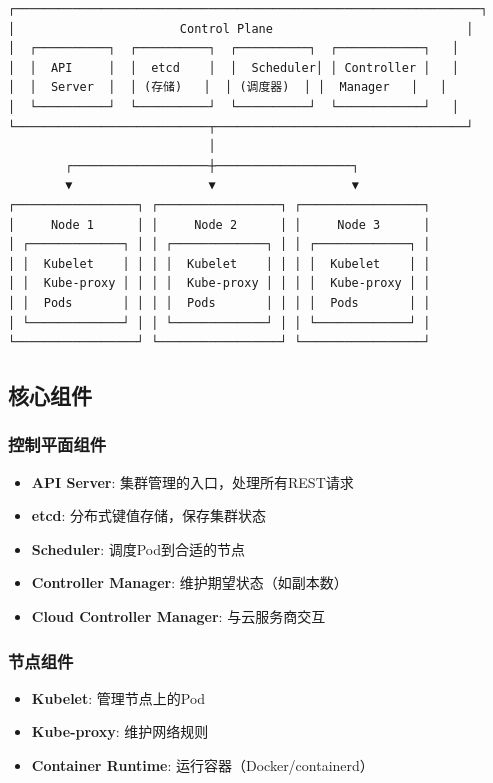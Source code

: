\documentclass[12pt,UTF8]{ctexbook}
\begin{document}
\begin{lstlisting}
┌─────────────────────────────────────────────────────────────────┐
│                       Control Plane                           │
│  ┌──────────┐  ┌──────────┐  ┌──────────┐  ┌────────────┐   │
│  │  API     │  │  etcd    │  │  Scheduler│ │ Controller │   │
│  │  Server  │  │ (存储)   │  │ (调度器)  │ │  Manager   │   │
│  └──────────┘  └──────────┘  └──────────┘  └────────────┘   │
└───────────────────────────┬───────────────────────────────────┘
                            │
        ┌───────────────────┼───────────────────┐
        ▼                   ▼                   ▼
┌─────────────────┐ ┌─────────────────┐ ┌─────────────────┐
│     Node 1      │ │     Node 2      │ │     Node 3      │
│ ┌─────────────┐ │ │ ┌─────────────┐ │ │ ┌─────────────┐ │
│ │  Kubelet    │ │ │ │  Kubelet    │ │ │ │  Kubelet    │ │
│ │  Kube-proxy │ │ │ │  Kube-proxy │ │ │ │  Kube-proxy │ │
│ │  Pods       │ │ │ │  Pods       │ │ │ │  Pods       │ │
│ └─────────────┘ │ │ └─────────────┘ │ │ └─────────────┘ │
└─────────────────┘ └─────────────────┘ └─────────────────┘
\end{lstlisting}

\subsection{核心组件}

\subsubsection{控制平面组件}

\begin{itemize}
    \item \textbf{API Server}: 集群管理的入口，处理所有REST请求
    \item \textbf{etcd}: 分布式键值存储，保存集群状态
    \item \textbf{Scheduler}: 调度Pod到合适的节点
    \item \textbf{Controller Manager}: 维护期望状态（如副本数）
    \item \textbf{Cloud Controller Manager}: 与云服务商交互
\end{itemize}

\subsubsection{节点组件}

\begin{itemize}
    \item \textbf{Kubelet}: 管理节点上的Pod
    \item \textbf{Kube-proxy}: 维护网络规则
    \item \textbf{Container Runtime}: 运行容器（Docker/containerd）
\end{itemize}
\end{document}

